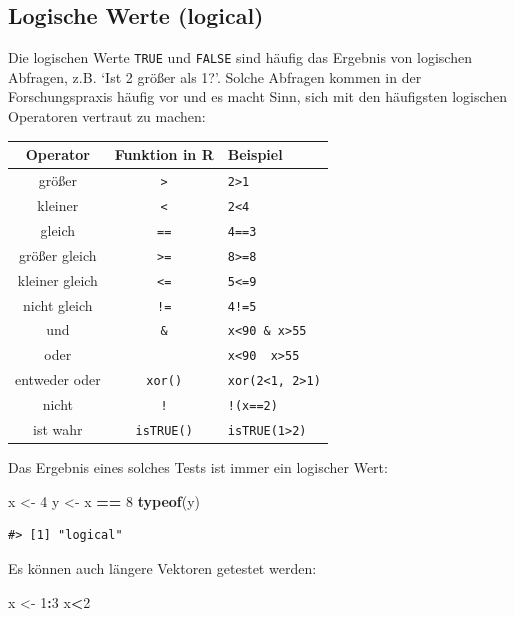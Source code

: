 \documentclass[]{book}
\newenvironment{Shaded}{\begin{snugshade}}{\end{snugshade}}
\newcommand{\KeywordTok}[1]{\textcolor[rgb]{0.13,0.29,0.53}{\textbf{#1}}}
\newcommand{\DecValTok}[1]{\textcolor[rgb]{0.00,0.00,0.81}{#1}}
\newcommand{\StringTok}[1]{\textcolor[rgb]{0.31,0.60,0.02}{#1}}
\newcommand{\OperatorTok}[1]{\textcolor[rgb]{0.81,0.36,0.00}{\textbf{#1}}}
\newcommand{\NormalTok}[1]{#1}
\begin{document}
\subsection{Logische Werte (logical)}\label{logische-werte-logical}

Die logischen Werte \texttt{TRUE} und \texttt{FALSE} sind häufig das
Ergebnis von logischen Abfragen, z.B. `Ist 2 größer als 1?'. Solche
Abfragen kommen in der Forschungspraxis häufig vor und es macht Sinn,
sich mit den häufigsten logischen Operatoren vertraut zu machen:

\begin{longtable}[]{@{}ccl@{}}
\toprule
Operator & Funktion in R & Beispiel\tabularnewline
\midrule
\endhead
größer & \texttt{\textgreater{}} &
\texttt{2\textgreater{}1}\tabularnewline
kleiner & \texttt{\textless{}} & \texttt{2\textless{}4}\tabularnewline
gleich & \texttt{==} & \texttt{4==3}\tabularnewline
größer gleich & \texttt{\textgreater{}=} &
\texttt{8\textgreater{}=8}\tabularnewline
kleiner gleich & \texttt{\textless{}=} &
\texttt{5\textless{}=9}\tabularnewline
nicht gleich & \texttt{!=} & \texttt{4!=5}\tabularnewline
und & \texttt{\&} &
\texttt{x\textless{}90\ \&\ x\textgreater{}55}\tabularnewline
oder & \texttt{\textbar{}} &
\texttt{x\textless{}90\ \textbar{}\ x\textgreater{}55}\tabularnewline
entweder oder & \texttt{xor()} &
\texttt{xor(2\textless{}1,\ 2\textgreater{}1)}\tabularnewline
nicht & \texttt{!} & \texttt{!(x==2)}\tabularnewline
ist wahr & \texttt{isTRUE()} &
\texttt{isTRUE(1\textgreater{}2)}\tabularnewline
\bottomrule
\end{longtable}

Das Ergebnis eines solches Tests ist immer ein logischer Wert:

\begin{Shaded}
\begin{Highlighting}[]
\NormalTok{x <-}\StringTok{ }\DecValTok{4}
\NormalTok{y <-}\StringTok{ }\NormalTok{x }\OperatorTok{==}\StringTok{ }\DecValTok{8}
\KeywordTok{typeof}\NormalTok{(y)}
\end{Highlighting}
\end{Shaded}

\begin{verbatim}
#> [1] "logical"
\end{verbatim}

Es können auch längere Vektoren getestet werden:

\begin{Shaded}
\begin{Highlighting}[]
\NormalTok{x <-}\StringTok{ }\DecValTok{1}\OperatorTok{:}\DecValTok{3}
\NormalTok{x}\OperatorTok{<}\DecValTok{2}
\end{Highlighting}
\end{Shaded}
\end{document}
